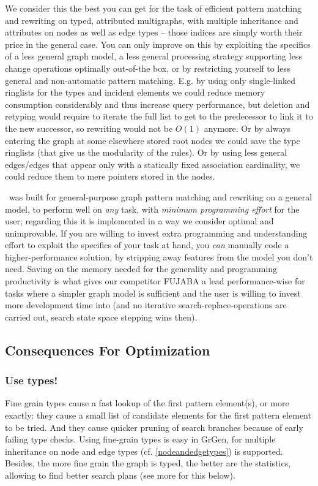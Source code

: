 We consider this the best you can get for the task of efficient pattern matching and rewriting on typed, attributed multigraphs, with multiple inheritance and attributes on nodes as well as edge types -- those indices are simply worth their price in the general case.
You can only improve on this by exploiting the specifics of a less general graph model, a less general processing strategy supporting less change operations optimally out-of-the box, or by restricting yourself to less general and non-automatic pattern matching.
E.g. by using only single-linked ringlists for the types and incident elements we could reduce memory consumption considerably and thus increase query performance, but deletion and retyping would require to iterate the full list to get to the predecessor to link it to the new successor, so rewriting would not be $O(1)$ anymore.
Or by always entering the graph at some elsewhere stored root nodes we could save the type ringlists (that give us the modularity of the rules).
Or by using less general edges/edges that appear only with a statically fixed association cardinality, we could reduce them to mere pointers stored in the nodes.

\GrG\ was built for general-purpose graph pattern matching and rewriting on a general model, to perform well on \emph{any} task, with \emph{minimum programming effort} for the user; regarding this it is implemented in a way we consider optimal and unimprovable.
If you are willing to invest extra programming and understanding effort to exploit the specifics of your task at hand, you \emph{can} manually code a higher-performance solution, by stripping away features from the model you don't need.
Saving on the memory needed for the generality and programming productivity is what gives our competitor FUJABA a lead performance-wise for tasks where a simpler graph model is sufficient and the user is willing to invest more development time into (and no iterative search-replace-operations are carried out, search state space stepping wins then).

\pagebreak %

\subsection{Consequences For Optimization}

\subsubsection*{Use types!}
Fine grain types cause a fast lookup of the first pattern element(s), or more exactly: they cause a small list of candidate elements for the first pattern element to be tried.
And they cause quicker pruning of search branches because of early failing type checks.
Using fine-grain types is easy in GrGen, for multiple inheritance on node and edge types (cf. \ref{nodeandedgetypes}) is supported.
Besides, the more fine grain the graph is typed, the better are the statistics, allowing \GrG{ } to find better search plans (see more for this below).

